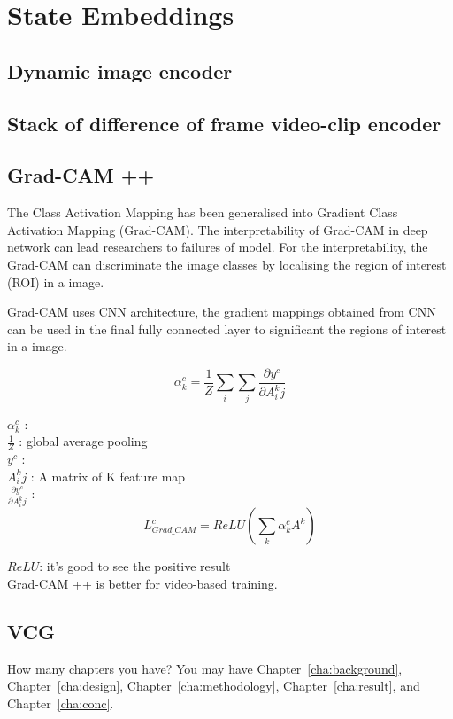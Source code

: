 \chapter{State Embeddings}


\section{Dynamic image encoder}


\section{Stack of difference of frame video-clip encoder}

\section{Grad-CAM ++}
The Class Activation Mapping has been generalised into Gradient Class Activation Mapping (Grad-CAM). The interpretability of Grad-CAM in deep network can lead researchers to failures of model. For the interpretability, the Grad-CAM can discriminate the image classes by localising the region of interest (ROI) in a image. 

Grad-CAM uses CNN architecture, the gradient mappings obtained from CNN can be used in the final fully connected layer to significant the regions of interest in a image. 
 
\[\alpha ^c_k = \frac{1}{Z}\sum_i \sum_j \frac{\partial y^c}{\partial A^k_ij}\]

 $\alpha ^c_k$ : \\
 
 $\frac{1}{Z}$ : global average pooling\\
 
 $y^c$ :\\
 
 $A^k_ij$ : A matrix of K feature map\\
 
 $\frac{\partial y^c}{\partial A^k_ij}$ :\\


\[L^c_{Grad\_CAM} = ReLU(\sum _k \alpha^c_kA^k)\]

$ReLU$:
it's good to see the positive result \\

Grad-CAM ++ is better for video-based training.


\section{VCG}
   

How many chapters you have? You may have Chapter~\ref{cha:background},
Chapter~\ref{cha:design}, Chapter~\ref{cha:methodology},
Chapter~\ref{cha:result}, and Chapter~\ref{cha:conc}.

